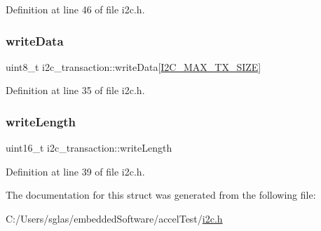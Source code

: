 Definition at line 46 of file i2c.\+h.

\mbox{\label{structi2c__transaction_a94035cb7ae168f3af5cfd510c5ad2d07}} 
\subsubsection{\texorpdfstring{writeData}{writeData}}
{\footnotesize\ttfamily uint8\+\_\+t i2c\+\_\+transaction\+::write\+Data\mbox{[}\mbox{\hyperlink{project__settings_8h_a7f177b43ed9acb3a242d59bb0634d472}{I2\+C\+\_\+\+M\+A\+X\+\_\+\+T\+X\+\_\+\+S\+I\+ZE}}\mbox{]}}



Definition at line 35 of file i2c.\+h.

\mbox{\label{structi2c__transaction_ab8a9791877d01a031701758f2dd8973f}} 
\subsubsection{\texorpdfstring{writeLength}{writeLength}}
{\footnotesize\ttfamily uint16\+\_\+t i2c\+\_\+transaction\+::write\+Length}



Definition at line 39 of file i2c.\+h.



The documentation for this struct was generated from the following file\+:\begin{DoxyCompactItemize}
\item 
C\+:/\+Users/sglas/embedded\+Software/accel\+Test/\mbox{\hyperlink{i2c_8h}{i2c.\+h}}\end{DoxyCompactItemize}
